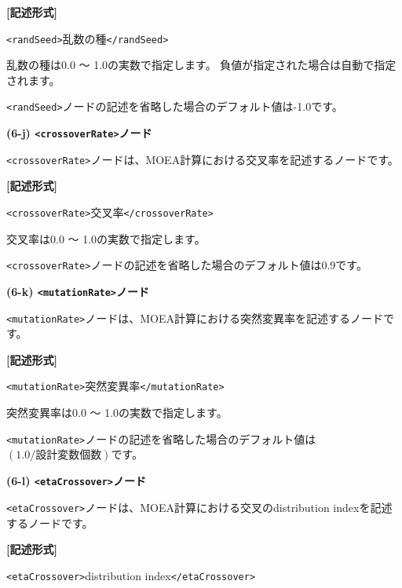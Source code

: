 \documentclass[a4paper,11pt]{jarticle}
\begin{document}
{\vspace{8pt}
\leftskip=12pt
\textbf{[記述形式]}

\leftskip=42pt
\texttt{<randSeed>}乱数の種\texttt{</randSeed>}

\vspace{8pt}
\leftskip=0pt
乱数の種は0.0 〜 1.0の実数で指定します。
負値が指定された場合は自動で指定されます。

\texttt{<randSeed>}ノードの記述を省略した場合のデフォルト値は-1.0です。

\vspace{12pt}
\textbf{(6-j) \texttt{<crossoverRate>}ノード}

\texttt{<crossoverRate>}ノードは、MOEA計算における交叉率を記述するノードです。

\vspace{8pt}
\leftskip=12pt
\textbf{[記述形式]}

\leftskip=42pt
\texttt{<crossoverRate>}交叉率\texttt{</crossoverRate>}

\vspace{8pt}
\leftskip=0pt
交叉率は0.0 〜 1.0の実数で指定します。

\texttt{<crossoverRate>}ノードの記述を省略した場合のデフォルト値は0.9です。

\vspace{12pt}
\textbf{(6-k) \texttt{<mutationRate>}ノード}

\texttt{<mutationRate>}ノードは、MOEA計算における突然変異率を記述するノードです。

\vspace{8pt}
\leftskip=12pt
\textbf{[記述形式]}

\leftskip=42pt
\texttt{<mutationRate>}突然変異率\texttt{</mutationRate>}

\vspace{8pt}
\leftskip=0pt
突然変異率は0.0 〜 1.0の実数で指定します。

\texttt{<mutationRate>}ノードの記述を省略した場合のデフォルト値は$(1.0 / 設計変数個数)$です。

\vspace{12pt}
\textbf{(6-l) \texttt{<etaCrossover>}ノード}

\texttt{<etaCrossover>}ノードは、MOEA計算における交叉のdistribution indexを記述するノードです。

\vspace{8pt}
\leftskip=12pt
\textbf{[記述形式]}

\leftskip=42pt
\texttt{<etaCrossover>}distribution index\texttt{</etaCrossover>}

}
\end{document}
